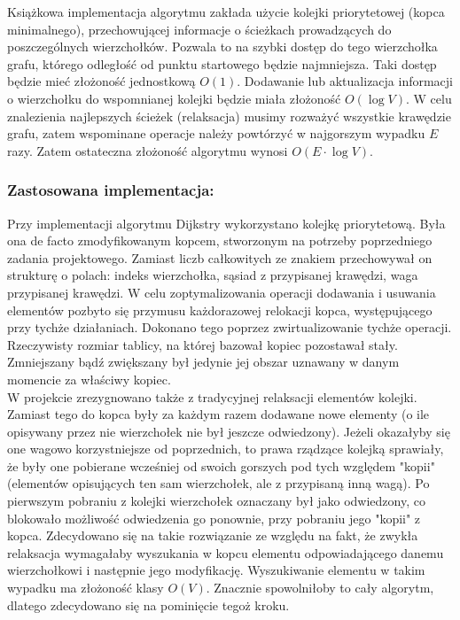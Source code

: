 \documentclass[a4paper,12pt]{article}
\begin{document}
\noindent
Książkowa implementacja algorytmu zakłada użycie kolejki priorytetowej (kopca minimalnego), przechowującej informacje o ścieżkach prowadzących do poszczególnych wierzchołków. Pozwala to na szybki dostęp do tego wierzchołka grafu, którego odległość od punktu startowego będzie najmniejsza. Taki dostęp będzie mieć złożoność jednostkową $O(1)$. Dodawanie lub aktualizacja informacji o wierzchołku do wspomnianej kolejki będzie miała złożoność $O(\log V)$. W celu znalezienia najlepszych ścieżek (relaksacja) musimy rozważyć wszystkie krawędzie grafu, zatem wspominane operacje należy powtórzyć w najgorszym wypadku $E$ razy. Zatem ostateczna złożoność algorytmu wynosi $O (E \cdot \log V)$.

\subsubsection{Zastosowana implementacja:}
Przy implementacji algorytmu Dijkstry wykorzystano kolejkę priorytetową. Była ona de facto zmodyfikowanym kopcem, stworzonym na potrzeby poprzedniego zadania projektowego. Zamiast liczb całkowitych ze znakiem przechowywał on strukturę o polach: indeks wierzchołka, sąsiad z przypisanej krawędzi, waga przypisanej krawędzi. W celu zoptymalizowania operacji dodawania i usuwania elementów pozbyto się przymusu każdorazowej relokacji kopca, występującego przy tychże działaniach. Dokonano tego poprzez zwirtualizowanie tychże operacji. Rzeczywisty rozmiar tablicy, na której bazował kopiec pozostawał stały. Zmniejszany bądź zwiększany był jedynie jej obszar uznawany w danym momencie za właściwy kopiec.\\

\noindent
W projekcie zrezygnowano także z tradycyjnej relaksacji elementów kolejki. Zamiast tego do kopca były za każdym razem dodawane nowe elementy (o ile opisywany przez nie wierzchołek nie był jeszcze odwiedzony). Jeżeli okazałyby się one wagowo korzystniejsze od poprzednich, to prawa rządzące kolejką sprawiały, że były one pobierane wcześniej od swoich gorszych pod tych względem "kopii" (elementów opisujących ten sam wierzchołek, ale z przypisaną inną wagą). Po pierwszym pobraniu z kolejki wierzchołek oznaczany był jako odwiedzony, co blokowało możliwość odwiedzenia go ponownie, przy pobraniu jego "kopii" z kopca. Zdecydowano się na takie rozwiązanie ze względu na fakt, że zwykła relaksacja wymagałaby wyszukania w kopcu elementu odpowiadającego danemu wierzchołkowi i następnie jego modyfikację. Wyszukiwanie elementu w takim wypadku ma złożoność klasy $O(V)$. Znacznie spowolniłoby to cały algorytm, dlatego zdecydowano się na pominięcie tegoż kroku.
\end{document}
